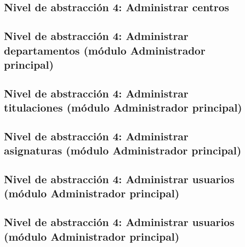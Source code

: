 \subsection{Nivel de abstracción 4: Administrar centros}



\subsection{Nivel de abstracción 4: Administrar departamentos (módulo Administrador principal)}



\subsection{Nivel de abstracción 4: Administrar titulaciones (\-mó\-dulo Administrador principal)}



\subsection{Nivel de abstracción 4: Administrar asignaturas (\-mó\-dulo Administrador principal)}



\subsection{Nivel de abstracción 4: Administrar usuarios (\-mó\-dulo Administrador principal)}



\subsection{Nivel de abstracción 4: Administrar usuarios (\-mó\-dulo Administrador principal)}

